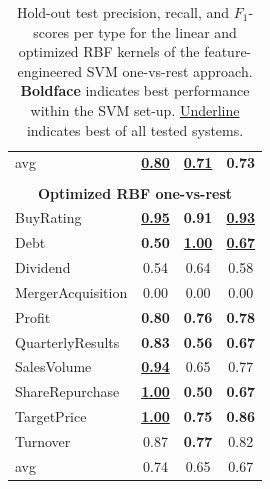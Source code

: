 \documentclass[11pt,a4paper]{article}
\begin{document}
\begin{table}[!htb]
{\begin{tabular}{p{2.8cm} c c c}
			\hdashline                                                                          
			avg                 & \underline{\textbf{0.80}} & \underline{\textbf{0.71}} & \textbf{0.73}             \\
			\\
			\multicolumn{4}{c}{\textbf{Optimized RBF one-vs-rest}}                            \\
			\hline
			BuyRating           & \underline{\textbf{0.95}} & \textbf{0.91}             & \underline{\textbf{0.93}} \\
			Debt                & \textbf{0.50}             & \underline{\textbf{1.00}} & \underline{\textbf{0.67}} \\
			Dividend            & 0.54                      & 0.64                      & 0.58                      \\
			MergerAcquisition   & 0.00                      & 0.00                      & 0.00                      \\
			Profit              & \textbf{0.80}             & \textbf{0.76}             & \textbf{0.78}             \\
			QuarterlyResults    & \textbf{0.83}             & \textbf{0.56}             & \textbf{0.67}             \\
			SalesVolume         & \underline{\textbf{0.94}} & 0.65                      & 0.77                      \\
			ShareRepurchase     & \underline{\textbf{1.00}} & \textbf{0.50}             & \textbf{0.67}             \\
			TargetPrice         & \underline{\textbf{1.00}} & \textbf{0.75}             & \textbf{0.86 }            \\
			Turnover            & 0.87                      & \textbf{0.77}             & 0.82                      \\
			\hdashline                                                                          
			avg                 & 0.74                      & 0.65                      & 0.67                      \\
		\end{tabular}
		\caption{Hold-out test precision, recall, and $F_1$-scores per type for the linear and optimized RBF kernels of the feature-engineered SVM one-vs-rest approach. \textbf{Boldface} indicates best performance within the SVM set-up. \underline{Underline} indicates best of all tested systems.}
		\label{tab:svmonevsrest}
	}
\end{table}
\end{document}
